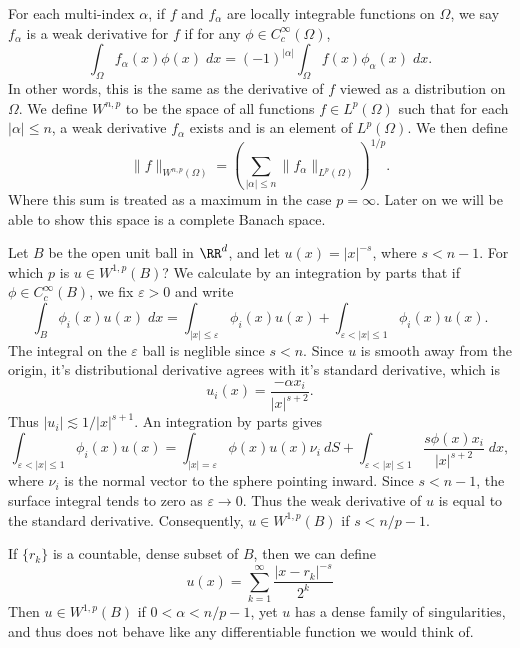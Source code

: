 For each multi-index $\alpha$, if $f$ and $f_\alpha$ are locally integrable functions on $\Omega$, we say $f_\alpha$ is a weak derivative for $f$ if for any $\phi \in C_c^\infty(\Omega)$,
%
\[ \int_\Omega f_\alpha(x) \phi(x)\; dx = (-1)^{|\alpha|} \int_\Omega f(x) \phi_\alpha(x)\; dx. \]
%
In other words, this is the same as the derivative of $f$ viewed as a distribution on $\Omega$. We define $W^{n,p}$ to be the space of all functions $f \in L^p(\Omega)$ such that for each $|\alpha| \leq n$, a weak derivative $f_\alpha$ exists and is an element of $L^p(\Omega)$. We then define
%
\[ \| f \|_{W^{n,p}(\Omega)} = \left( \sum_{|\alpha| \leq n} \| f_\alpha \|_{L^p(\Omega)} \right)^{1/p}. \]
%
Where this sum is treated as a maximum in the case $p = \infty$. Later on we will be able to show this space is a complete Banach space.

\begin{example}
  Let $B$ be the open unit ball in $\RR^d$, and let $u(x) = |x|^{-s}$, where $s < n-1$. For which $p$ is $u \in W^{1,p}(B)$? We calculate by an integration by parts that if $\phi \in C_c^\infty(B)$, we fix $\varepsilon > 0$ and write
  \[ \int_B \phi_i(x) u(x)\; dx = \int_{|x| \leq \varepsilon} \phi_i(x) u(x) + \int_{\varepsilon < |x| \leq 1} \phi_i(x) u(x). \]
  The integral on the $\varepsilon$ ball is neglible since $s < n$. Since $u$ is smooth away from the origin, it's distributional derivative agrees with it's standard derivative, which is
  \[ u_i(x) = \frac{- \alpha x_i}{|x|^{s + 2}}. \]
  Thus $|u_i| \lesssim 1/|x|^{s + 1}$. An integration by parts gives
  \[ \int_{\varepsilon < |x| \leq 1} \phi_i(x) u(x) = \int_{|x| = \varepsilon} \phi(x) u(x) \nu_i\ dS + \int_{\varepsilon < |x| \leq 1} \frac{s \phi(x) x_i}{|x|^{s + 2}}\; dx, \]
  where $\nu_i$ is the normal vector to the sphere pointing inward. Since $s < n-1$, the surface integral tends to zero as $\varepsilon \to 0$. Thus the weak derivative of $u$ is equal to the standard derivative. Consequently, $u \in W^{1,p}(B)$ if $s < n/p - 1$.
\end{example}

\begin{example}
  If $\{ r_k \}$ is a countable, dense subset of $B$, then we can define
  \[ u(x) = \sum_{k = 1}^\infty \frac{|x - r_k|^{-s}}{2^k} \]
  Then $u \in W^{1,p}(B)$ if $0 < \alpha < n/p - 1$, yet $u$ has a dense family of singularities, and thus does not behave like any differentiable function we would think of.
\end{example}

